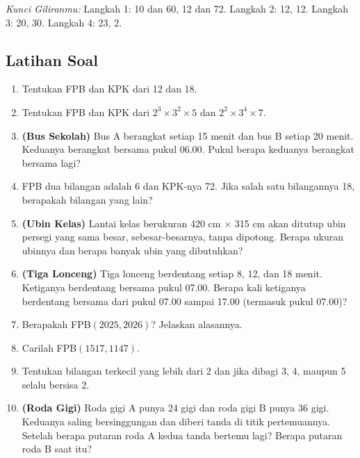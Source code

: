 \documentclass[11pt,a4paper]{article}
\begin{document}
\textit{Kunci Giliranmu:} Langkah 1: 10 dan 60, 12 dan 72. \quad Langkah 2: 12, 12. \quad
Langkah 3: 20, 30. \quad Langkah 4: 23, 2.

\newpage
\subsection*{Latihan Soal}

\begin{enumerate}
    \item Tentukan FPB dan KPK dari 12 dan 18.
    \item Tentukan FPB dan KPK dari $2^3 \times 3^2 \times 5$ dan $2^2 \times 3^4 \times 7$.
    \item \textbf{(Bus Sekolah)} Bus A berangkat setiap 15 menit dan bus B setiap 20 menit.
          Keduanya berangkat bersama pukul 06.00. Pukul berapa keduanya berangkat bersama lagi?
    \item FPB dua bilangan adalah 6 dan KPK-nya 72. Jika salah satu bilangannya 18, berapakah
          bilangan yang lain?
    \item \textbf{(Ubin Kelas)} Lantai kelas berukuran 420 cm $\times$ 315 cm akan ditutup ubin
          persegi yang sama besar, sebesar-besarnya, tanpa dipotong. Berapa ukuran ubinnya dan
          berapa banyak ubin yang dibutuhkan?
\end{enumerate}

\begin{enumerate}
    \setcounter{enumi}{5}
    \item \textbf{(Tiga Lonceng)} Tiga lonceng berdentang setiap 8, 12, dan 18 menit. Ketiganya
          berdentang bersama pukul 07.00. Berapa kali ketiganya berdentang bersama dari pukul 07.00
          sampai 17.00 (termasuk pukul 07.00)?
    \item Berapakah FPB$(2025, 2026)$? Jelaskan alasannya.
    \item Carilah FPB$(1517, 1147)$.
    \item Tentukan bilangan terkecil yang lebih dari 2 dan jika dibagi 3, 4, maupun 5 selalu
          bersisa 2.
    \item \textbf{(Roda Gigi)} Roda gigi A punya 24 gigi dan roda gigi B punya 36 gigi. Keduanya
          saling bersinggungan dan diberi tanda di titik pertemuannya. Setelah berapa putaran
          roda A kedua tanda bertemu lagi? Berapa putaran roda B saat itu?
\end{enumerate}
\end{document}
